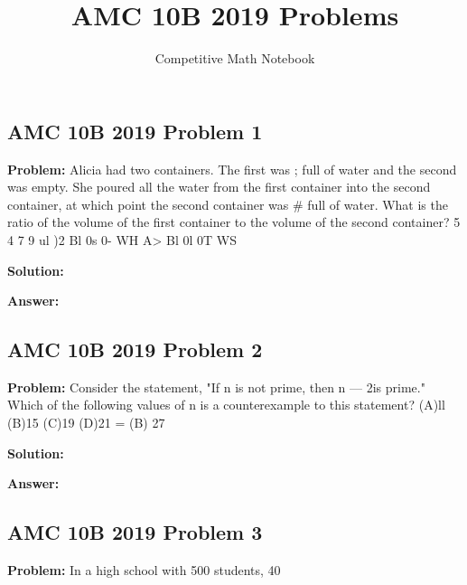 \documentclass{article}
\title{AMC 10B 2019 Problems}
\author{Competitive Math Notebook}
\date{}
\newenvironment{problem}{\textbf{Problem: }}{\\}
\newenvironment{solution}{\textbf{Solution: }}{\\}
\newenvironment{answer}{\textbf{Answer: }}{\\}
\begin{document}
\maketitle

\subsection{AMC 10B 2019 Problem 1}

\begin{problem}
Alicia had two containers. The first was ; full of water and the second was empty. She poured all the water from the first container into the second container, at which point the second container was # full of water. What is the ratio of the volume of the first container to the volume of the second container? 5 4 7 9 ul )2 Bl 0s 0- WH A> Bl 0l 0T WS
\end{problem}

\begin{solution}
\end{solution}

\begin{answer}
\end{answer}

\subsection{AMC 10B 2019 Problem 2}

\begin{problem}
Consider the statement, "If n is not prime, then n — 2is prime." Which of the following values of n is a counterexample to this statement? (A)ll (B)15 (C)19 (D)21 = (B) 27
\end{problem}

\begin{solution}
\end{solution}

\begin{answer}
\end{answer}

\subsection{AMC 10B 2019 Problem 3}

\begin{problem}
In a high school with 500 students, 40%
\end{problem}
\end{document}
